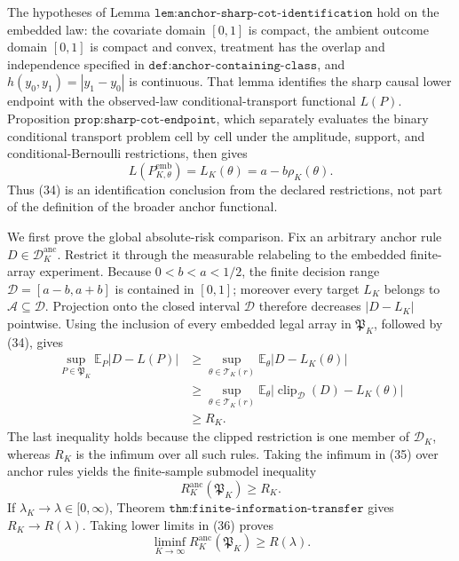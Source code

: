 The hypotheses of Lemma
\(\texttt{lem:anchor-sharp-cot-identification}\) hold on the embedded
law: the covariate domain \([0,1]\) is compact, the ambient outcome domain
\([0,1]\) is compact and convex, treatment has the overlap and
independence specified in \(\texttt{def:anchor-containing-class}\), and
\(h(y_0,y_1)=|y_1-y_0|\) is continuous.  That lemma identifies the sharp
causal lower endpoint with the observed-law conditional-transport
functional \(L(P)\).  Proposition
\(\texttt{prop:sharp-cot-endpoint}\), which separately evaluates the
binary conditional transport problem cell by cell under the amplitude,
support, and conditional-Bernoulli restrictions, then gives
\[
 L(P_{K,\theta}^{\mathrm{emb}})
 =L_K(\theta)=a-b\rho_K(\theta).
 \tag{34}
\]
Thus (34) is an identification conclusion from the declared restrictions,
not part of the definition of the broader anchor functional.

We first prove the global absolute-risk comparison.  Fix an arbitrary
anchor rule \(D\in\mathscr D_K^{\mathrm{anc}}\).  Restrict it through the
measurable relabeling to the embedded finite-array experiment.  Because
\(0<b<a<1/2\), the finite decision range
\(\mathcal D=[a-b,a+b]\) is contained in \([0,1]\); moreover every target
\(L_K\) belongs to \(\mathcal A\subseteq\mathcal D\).  Projection onto
the closed interval \(\mathcal D\) therefore decreases
\(|D-L_K|\) pointwise.  Using the inclusion of every embedded legal array
in \(\mathfrak P_K\), followed by (34), gives
\[
\begin{aligned}
 \sup_{P\in\mathfrak P_K}\mathbb E_P|D-L(P)|
 &\geq
 \sup_{\theta\in\mathcal T_K(r)}
 \mathbb E_\theta|D-L_K(\theta)|\\
 &\geq
 \sup_{\theta\in\mathcal T_K(r)}
 \mathbb E_\theta
 \bigl|\operatorname{clip}_{\mathcal D}(D)-L_K(\theta)\bigr|\\
 &\geq R_K.
\end{aligned}
 \tag{35}
\]
The last inequality holds because the clipped restriction is one member of
\(\mathscr D_K\), whereas \(R_K\) is the infimum over all such rules.
Taking the infimum in (35) over anchor rules yields the finite-sample
submodel inequality
\[
 R_K^{\mathrm{anc}}(\mathfrak P_K)\geq R_K.
 \tag{36}
\]
If \(\lambda_K\to\lambda\in[0,\infty)\), Theorem
\(\texttt{thm:finite-information-transfer}\) gives
\(R_K\to R(\lambda)\).  Taking lower limits in (36) proves
\[
 \liminf_{K\to\infty}R_K^{\mathrm{anc}}(\mathfrak P_K)
 \geq R(\lambda).
 \tag{37}
\]

